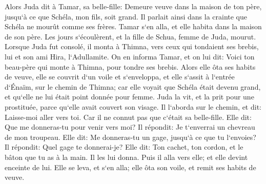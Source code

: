\verse Alors Juda dit à Tamar, sa belle-fille: Demeure veuve dans la maison de ton père, jusqu`à ce que Schéla, mon fils, soit grand. Il parlait ainsi dans la crainte que Schéla ne mourût comme ses frères. Tamar s`en alla, et elle habita dans la maison de son père. 
\verse Les jours s`écoulèrent, et la fille de Schua, femme de Juda, mourut. Lorsque Juda fut consolé, il monta à Thimna, vers ceux qui tondaient ses brebis, lui et son ami Hira, l`Adullamite. 
\verse On en informa Tamar, et on lui dit: Voici ton beau-père qui monte à Thimna, pour tondre ses brebis. 
\verse Alors elle ôta ses habits de veuve, elle se couvrit d`un voile et s`enveloppa, et elle s`assit à l`entrée d`Énaïm, sur le chemin de Thimna; car elle voyait que Schéla était devenu grand, et qu`elle ne lui était point donnée pour femme. 
\verse Juda la vit, et la prit pour une prostituée, parce qu`elle avait couvert son visage. 
\verse Il l`aborda sur le chemin, et dit: Laisse-moi aller vers toi. Car il ne connut pas que c`était sa belle-fille. Elle dit: Que me donneras-tu pour venir vers moi? 
\verse Il répondit: Je t`enverrai un chevreau de mon troupeau. Elle dit: Me donneras-tu un gage, jusqu`à ce que tu l`envoies? 
\verse Il répondit: Quel gage te donnerai-je? Elle dit: Ton cachet, ton cordon, et le bâton que tu as à la main. Il les lui donna. Puis il alla vers elle; et elle devint enceinte de lui. 
\verse Elle se leva, et s`en alla; elle ôta son voile, et remit ses habits de veuve. 
